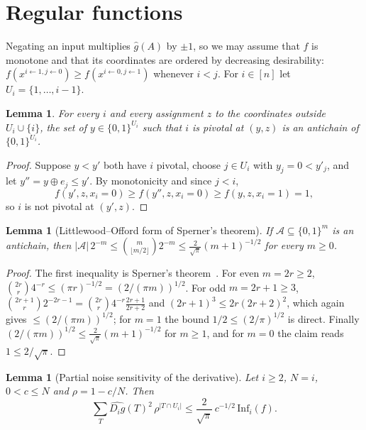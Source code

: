 \documentclass[11pt]{amsart}
\newtheorem{lemma}[theorem]{Lemma}
\theoremstyle{definition}
\theoremstyle{remark}
\newcommand{\Inf}{\mathrm{Inf}}
\newcommand{\hatg}{\widehat{g}}
\newcommand{\bits}{\{0,1\}}
\begin{document}
\section{Regular functions}\label{sec:regular}

Negating an input multiplies $\hatg(A)$ by $\pm1$, so we may assume that $f$ is monotone and that its coordinates
are ordered by decreasing desirability: $f(x^{i\leftarrow1,j\leftarrow0})\ge f(x^{i\leftarrow0,j\leftarrow1})$
whenever $i<j$. For $i\in[n]$ let $U_i=\{1,\dots,i-1\}$.

\begin{lemma}\label{lem:antichain}
For every $i$ and every assignment $z$ to the coordinates outside $U_i\cup\{i\}$, the set of $y\in\bits^{U_i}$ such
that $i$ is pivotal at $(y,z)$ is an antichain of $\bits^{U_i}$.
\end{lemma}

\begin{proof}
Suppose $y<y'$ both have $i$ pivotal, choose $j\in U_i$ with $y_j=0<y'_j$, and let $y''=y\oplus e_j\le y'$. By
monotonicity and since $j<i$,
\[
f(y',z,x_i=0)\ge f(y'',z,x_i=0)\ge f(y,z,x_i=1)=1,
\]
so $i$ is not pivotal at $(y',z)$.
\end{proof}

\begin{lemma}[Littlewood--Offord form of Sperner's theorem]\label{lem:sperner}
If $\mathcal A\subseteq\bits^m$ is an antichain, then $|\mathcal A|\,2^{-m}\le\binom m{\lfloor m/2\rfloor}2^{-m}
\le\frac{2}{\sqrt\pi}(m+1)^{-1/2}$ for every $m\ge0$.
\end{lemma}

\begin{proof}
The first inequality is Sperner's theorem~\cite{Spe28}. For even $m=2r\ge2$, $\binom{2r}r4^{-r}\le(\pi r)^{-1/2}
=(2/(\pi m))^{1/2}$. For odd $m=2r+1\ge3$, $\binom{2r+1}r2^{-2r-1}=\binom{2r}r4^{-r}\frac{2r+1}{2r+2}$ and
$(2r+1)^3\le2r(2r+2)^2$, which again gives $\le(2/(\pi m))^{1/2}$; for $m=1$ the bound $1/2\le(2/\pi)^{1/2}$ is
direct. Finally $(2/(\pi m))^{1/2}\le\frac2{\sqrt\pi}(m+1)^{-1/2}$ for $m\ge1$, and for $m=0$ the claim reads
$1\le2/\sqrt\pi$.
\end{proof}

\begin{lemma}[Partial noise sensitivity of the derivative]\label{lem:noise}
Let $i\ge2$, $N=i$, $0<c\le N$ and $\rho=1-c/N$. Then
\[
\sum_{T}\widehat{D_ig}(T)^2\,\rho^{|T\cap U_i|}\le\frac2{\sqrt\pi}\,c^{-1/2}\,\Inf_i(f).
\]
\end{lemma}
\end{document}
